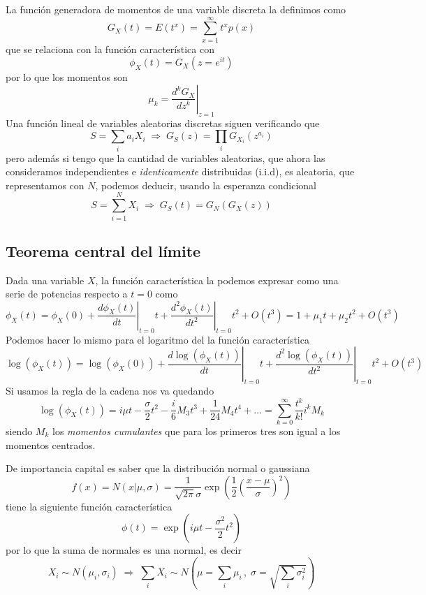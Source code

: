 \documentclass{article}
\numberwithin{equation}{section} %
\begin{document}
La función generadora de momentos de una variable discreta la definimos como
\begin{equation}
G_{X}(t) = E(t^x) = \sum_{x = 1}^{\infty} t^x p(x) 
\end{equation}
que se relaciona con la función característica con
\begin{equation}
\phi_{X}(t) = G_{X}(z = e^{i t})
\end{equation}
por lo que los momentos son
\begin{equation}
\mu_k = \left.\frac{d^{k} G_{X}}{dz^k}\right|_{z=1}
\end{equation}
Una función lineal de variables aleatorias discretas siguen verificando que
\begin{equation}
S = \sum_{i} a_i X_i \; \Rightarrow \; G_{S}(z) = \prod_{i} G_{X_i}(z^{a_i})
\end{equation}
pero además si tengo que la cantidad de variables aleatorias, que ahora las consideramos independientes e \emph{identicamente} distribuidas (i.i.d), es aleatoria, que representamos con $N$, podemos deducir, usando la esperanza condicional
\begin{equation}
S = \sum^N_{i=1} X_i \; \Rightarrow \; G_{S}(t) = G_N(G_{X}(z))
\end{equation}
\subsection{Teorema central del límite}
Dada una variable $X$, la función característica la podemos expresar como una serie de potencias respecto a $t = 0$ como
\[\phi_{X}(t) = \phi_{X}(0) + \left.\frac{d \phi_{X}(t)}{d t}\right|_{t=0} t + \left.\frac{d^2 \phi_{X}(t)}{d t^2}\right|_{t=0} t^2 + O(t^3) = 1 + \mu_1 t + \mu_2 t^2 + O(t^3) \]
Podemos hacer lo mismo para el logaritmo del la función característica
\[\log(\phi_X(t)) = \log(\phi_X(0)) + \left.\frac{d \log(\phi_X(t))}{dt}\right|_{t=0} t + \left.\frac{d^2 \log(\phi_X(t))}{dt^2}\right|_{t=0} t^2 + O(t^3)\]
Si usamos la regla de la cadena nos va quedando 
\begin{equation}
\log(\phi_X(t)) = i \mu t - \frac{\sigma}{2} t^2 - \frac{i}{6} M_3 t^3 + \frac{1}{24} M_4 t^4 + \dots = \sum_{k=0}^{\infty} \frac{t^k}{k!} i^k M_k
\end{equation}
siendo $M_k$ los \emph{momentos cumulantes} que para los primeros tres son igual a los momentos centrados.

De importancia capital es saber que la distribución normal o gaussiana
\begin{equation}
f(x) = N(x|\mu, \sigma) = \frac{1}{\sqrt{2 \pi} \sigma} \exp\left(\frac{1}{2}\left(\frac{x - \mu}{\sigma}\right)^2\right)
\end{equation}
tiene la siguiente función característica
\begin{equation}
\phi(t) = \exp\left(i \mu t - \frac{\sigma^2}{2} t^2\right)
\end{equation}
por lo que la suma de normales es una normal, es decir
\begin{equation}
X_i \sim N(\mu_i, \sigma_i) \; \Rightarrow \; \sum_i X_i \sim N\left(\mu = \sum_i \mu_i\,,\; \sigma = \sqrt{\sum_i \sigma^2_i}\right)
\end{equation}
\end{document}
